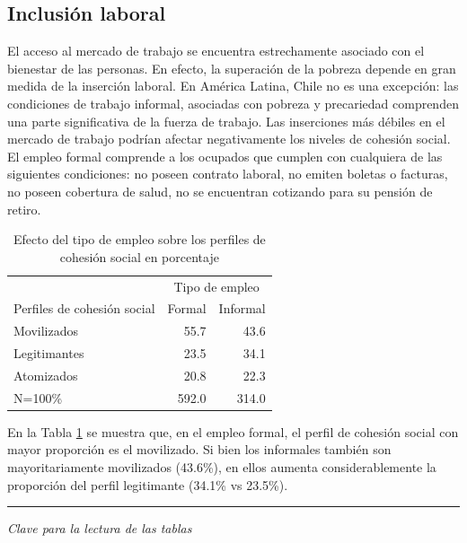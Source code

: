 \documentclass[
  12pt,
]{book}
\begin{document}
\hypertarget{inclusiuxf3n-laboral}{%
\subsection{Inclusión laboral}\label{inclusiuxf3n-laboral}}

El acceso al mercado de trabajo se encuentra estrechamente asociado con el bienestar de las personas. En efecto, la superación de la pobreza depende en gran medida de la inserción laboral. En América Latina, Chile no es una excepción: las condiciones de trabajo informal, asociadas con pobreza y precariedad comprenden una parte significativa de la fuerza de trabajo. Las inserciones más débiles en el mercado de trabajo podrían afectar negativamente los niveles de cohesión social. El empleo formal comprende a los ocupados que cumplen con cualquiera de las siguientes condiciones: no poseen contrato laboral, no emiten boletas o facturas, no poseen cobertura de salud, no se encuentran cotizando para su pensión de retiro.

\begin{table}

\caption{\label{tab:tabla-empleo}Efecto del tipo de empleo sobre los perfiles de cohesión social en porcentaje}
\centering
\begin{tabular}[t]{l|r|r}
\hline
\multicolumn{1}{c|}{ } & \multicolumn{2}{c}{Tipo de empleo} \\
\cline{2-3}
Perfiles de cohesión social & Formal & Informal\\
\hline
Movilizados & 55.7 & 43.6\\
\hline
Legitimantes & 23.5 & 34.1\\
\hline
Atomizados & 20.8 & 22.3\\
\hline
N=100\% & 592.0 & 314.0\\
\hline
\end{tabular}
\end{table}

En la Tabla \ref{tab:tabla-empleo} se muestra que, en el empleo formal, el perfil de cohesión social con mayor proporción es el movilizado. Si bien los informales también son mayoritariamente movilizados (43.6\%), en ellos aumenta considerablemente la proporción del perfil legitimante (34.1\% vs 23.5\%).

\begin{center}\rule{0.5\linewidth}{0.5pt}\end{center}

\emph{Clave para la lectura de las tablas}
\end{document}
